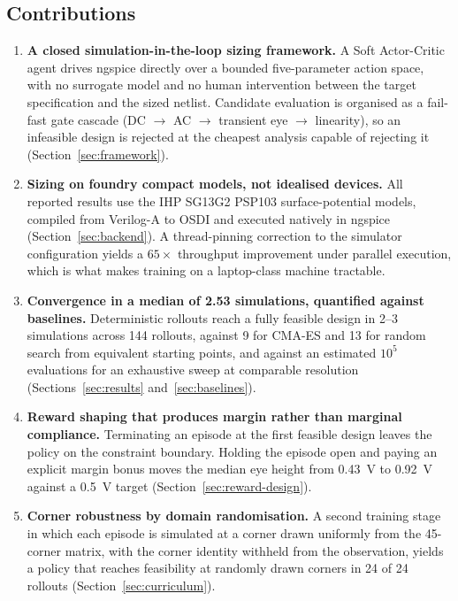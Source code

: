 \documentclass[10pt,a4paper]{article}
\begin{document}
\subsection{Contributions}
\label{sec:contributions}

\begin{enumerate}[leftmargin=*,itemsep=2pt,topsep=3pt]
\item \textbf{A closed simulation-in-the-loop sizing framework.} A Soft
Actor-Critic agent drives ngspice directly over a bounded five-parameter action
space, with no surrogate model and no human intervention between the target
specification and the sized netlist. Candidate evaluation is organised as a
fail-fast gate cascade (DC $\rightarrow$ AC $\rightarrow$ transient eye
$\rightarrow$ linearity), so an infeasible design is rejected at the cheapest
analysis capable of rejecting it (Section~\ref{sec:framework}).

\item \textbf{Sizing on foundry compact models, not idealised devices.} All
reported results use the IHP SG13G2 PSP103 surface-potential models, compiled
from Verilog-A to OSDI and executed natively in ngspice
(Section~\ref{sec:backend}). A thread-pinning correction to the simulator
configuration yields a $65\times$ throughput improvement under parallel
execution, which is what makes training on a laptop-class machine tractable.

\item \textbf{Convergence in a median of 2.53 simulations, quantified against
baselines.} Deterministic rollouts reach a fully feasible design in 2--3
simulations across 144 rollouts, against 9 for CMA-ES and 13 for random search
from equivalent starting points, and against an estimated $10^5$ evaluations for
an exhaustive sweep at comparable resolution (Sections~\ref{sec:results}
and~\ref{sec:baselines}).

\item \textbf{Reward shaping that produces margin rather than marginal
compliance.} Terminating an episode at the first feasible design leaves the
policy on the constraint boundary. Holding the episode open and paying an
explicit margin bonus moves the median eye height from \SI{0.43}{\volt} to
\SI{0.92}{\volt} against a \SI{0.5}{\volt} target
(Section~\ref{sec:reward-design}).

\item \textbf{Corner robustness by domain randomisation.} A second training stage
in which each episode is simulated at a corner drawn uniformly from the
45-corner matrix, with the corner identity withheld from the observation, yields
a policy that reaches feasibility at randomly drawn corners in 24 of 24 rollouts
(Section~\ref{sec:curriculum}).


\end{enumerate}
\end{document}
